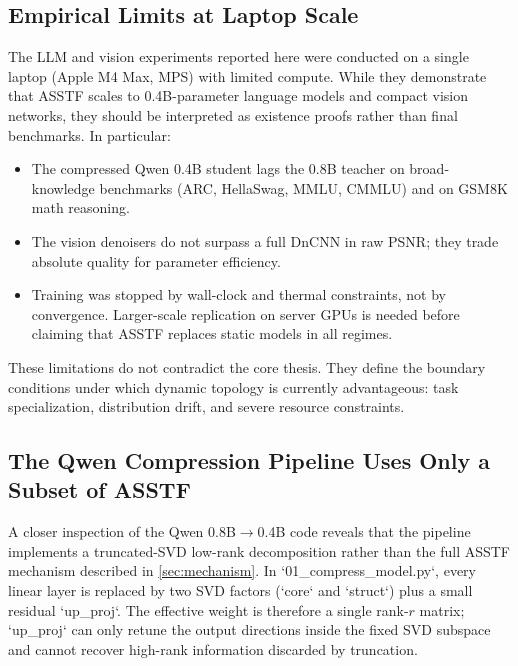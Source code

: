 \documentclass[11pt,a4paper]{article}
\theoremstyle{definition}
\begin{document}
\subsection{Empirical Limits at Laptop Scale}
\label{subsec:laptop_limits}

The LLM and vision experiments reported here were conducted on a single laptop (Apple M4 Max, MPS) with limited compute. While they demonstrate that ASSTF scales to 0.4B-parameter language models and compact vision networks, they should be interpreted as existence proofs rather than final benchmarks. In particular:

\begin{itemize}
    \item The compressed Qwen 0.4B student lags the 0.8B teacher on broad-knowledge benchmarks (ARC, HellaSwag, MMLU, CMMLU) and on GSM8K math reasoning.
    \item The vision denoisers do not surpass a full DnCNN in raw PSNR; they trade absolute quality for parameter efficiency.
    \item Training was stopped by wall-clock and thermal constraints, not by convergence. Larger-scale replication on server GPUs is needed before claiming that ASSTF replaces static models in all regimes.
\end{itemize}

These limitations do not contradict the core thesis. They define the boundary conditions under which dynamic topology is currently advantageous: task specialization, distribution drift, and severe resource constraints.

\subsection{The Qwen Compression Pipeline Uses Only a Subset of ASSTF}
\label{subsec:qwen_subset}

A closer inspection of the Qwen 0.8B$\rightarrow$0.4B code reveals that the pipeline implements a truncated-SVD low-rank decomposition rather than the full ASSTF mechanism described in \cref{sec:mechanism}. In `01\_compress\_model.py`, every linear layer is replaced by two SVD factors (`core` and `struct`) plus a small residual `up\_proj`. The effective weight is therefore a single rank-$r$ matrix; `up\_proj` can only retune the output directions inside the fixed SVD subspace and cannot recover high-rank information discarded by truncation.
\end{document}

